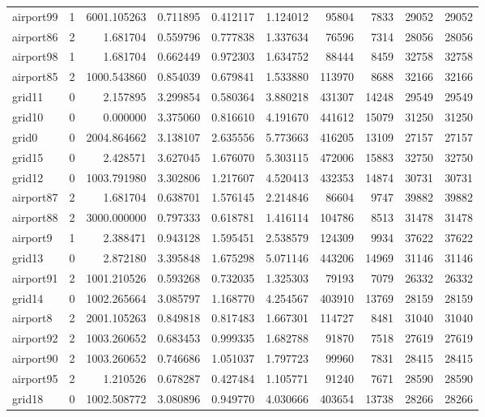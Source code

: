 \begin{longtable}{|l|r|r|r|r|r|r|r|r|r|}
airport99 & 1 & 6001.105263 & 0.711895 & 0.412117 & 1.124012 & 95804 & 7833 & 29052 & 29052 \\
airport86 & 2 & 1.681704 & 0.559796 & 0.777838 & 1.337634 & 76596 & 7314 & 28056 & 28056 \\
airport98 & 1 & 1.681704 & 0.662449 & 0.972303 & 1.634752 & 88444 & 8459 & 32758 & 32758 \\
airport85 & 2 & 1000.543860 & 0.854039 & 0.679841 & 1.533880 & 113970 & 8688 & 32166 & 32166 \\
grid11 & 0 & 2.157895 & 3.299854 & 0.580364 & 3.880218 & 431307 & 14248 & 29549 & 29549 \\
grid10 & 0 & 0.000000 & 3.375060 & 0.816610 & 4.191670 & 441612 & 15079 & 31250 & 31250 \\
grid0 & 0 & 2004.864662 & 3.138107 & 2.635556 & 5.773663 & 416205 & 13109 & 27157 & 27157 \\
grid15 & 0 & 2.428571 & 3.627045 & 1.676070 & 5.303115 & 472006 & 15883 & 32750 & 32750 \\
grid12 & 0 & 1003.791980 & 3.302806 & 1.217607 & 4.520413 & 432353 & 14874 & 30731 & 30731 \\
airport87 & 2 & 1.681704 & 0.638701 & 1.576145 & 2.214846 & 86604 & 9747 & 39882 & 39882 \\
airport88 & 2 & 3000.000000 & 0.797333 & 0.618781 & 1.416114 & 104786 & 8513 & 31478 & 31478 \\
airport9 & 1 & 2.388471 & 0.943128 & 1.595451 & 2.538579 & 124309 & 9934 & 37622 & 37622 \\
grid13 & 0 & 2.872180 & 3.395848 & 1.675298 & 5.071146 & 443206 & 14969 & 31146 & 31146 \\
airport91 & 2 & 1001.210526 & 0.593268 & 0.732035 & 1.325303 & 79193 & 7079 & 26332 & 26332 \\
grid14 & 0 & 1002.265664 & 3.085797 & 1.168770 & 4.254567 & 403910 & 13769 & 28159 & 28159 \\
airport8 & 2 & 2001.105263 & 0.849818 & 0.817483 & 1.667301 & 114727 & 8481 & 31040 & 31040 \\
airport92 & 2 & 1003.260652 & 0.683453 & 0.999335 & 1.682788 & 91870 & 7518 & 27619 & 27619 \\
airport90 & 2 & 1003.260652 & 0.746686 & 1.051037 & 1.797723 & 99960 & 7831 & 28415 & 28415 \\
airport95 & 2 & 1.210526 & 0.678287 & 0.427484 & 1.105771 & 91240 & 7671 & 28590 & 28590 \\
grid18 & 0 & 1002.508772 & 3.080896 & 0.949770 & 4.030666 & 403654 & 13738 & 28266 & 28266 \\

\end{longtable}
